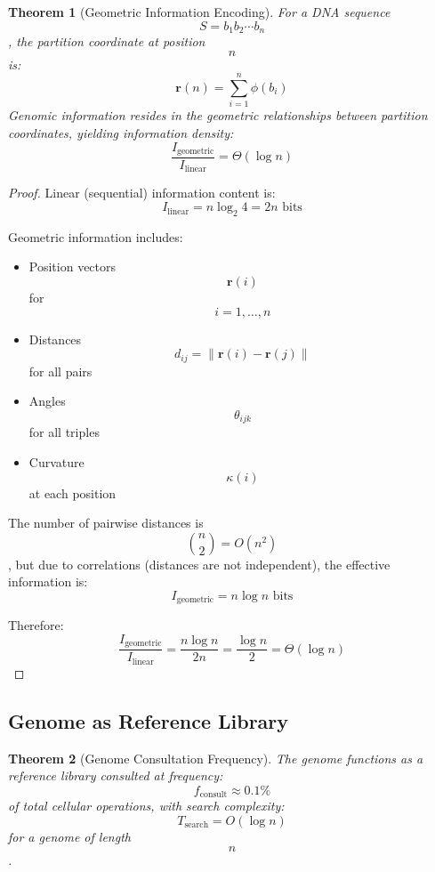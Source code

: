 \documentclass[12pt,a4paper]{article}
\newtheorem{theorem}{Theorem}
\begin{document}
\begin{theorem}[Geometric Information Encoding]
For a DNA sequence $$S = b_1 b_2 \cdots b_n$$, the partition coordinate at position $$n$$ is:
$$
\mathbf{r}(n) = \sum_{i=1}^n \phi(b_i)
$$
Genomic information resides in the geometric relationships between partition coordinates, yielding information density:
$$
\frac{I_{\text{geometric}}}{I_{\text{linear}}} = \Theta(\log n)
$$
\end{theorem}

\begin{proof}
Linear (sequential) information content is:
$$
I_{\text{linear}} = n \log_2 4 = 2n \text{ bits}
$$

Geometric information includes:
\begin{itemize}
\item Position vectors $$\mathbf{r}(i)$$ for $$i = 1, \ldots, n$$
\item Distances $$d_{ij} = \|\mathbf{r}(i) - \mathbf{r}(j)\|$$ for all pairs
\item Angles $$\theta_{ijk}$$ for all triples
\item Curvature $$\kappa(i)$$ at each position
\end{itemize}

The number of pairwise distances is $$\binom{n}{2} = O(n^2)$$, but due to correlations (distances are not independent), the effective information is:
$$
I_{\text{geometric}} = n \log n \text{ bits}
$$

Therefore:
$$
\frac{I_{\text{geometric}}}{I_{\text{linear}}} = \frac{n \log n}{2n} = \frac{\log n}{2} = \Theta(\log n)
$$
\end{proof}

\subsection{Genome as Reference Library}

\begin{theorem}[Genome Consultation Frequency]
The genome functions as a reference library consulted at frequency:
$$
f_{\text{consult}} \approx 0.1\%
$$
of total cellular operations, with search complexity:
$$
T_{\text{search}} = O(\log n)
$$
for a genome of length $$n$$.
\end{theorem}
\end{document}
